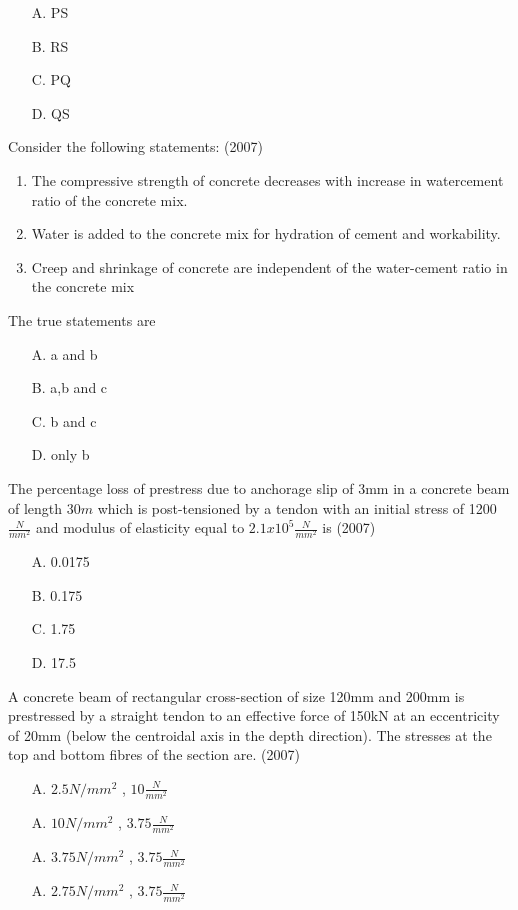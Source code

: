     \begin{enumerate}
        \item [A.] PS
        \item [B.] RS
        \item [C.] PQ
        \item [D.] QS
    \end{enumerate}
  \item  Consider the following statements: \hfill (2007)
  \begin{enumerate}
    \item The compressive strength of concrete decreases with increase in watercement ratio of the concrete mix.
    \item Water is added to the concrete mix for hydration of cement and
    workability. 
    \item Creep and shrinkage of concrete are independent of the water-cement ratio
    in the concrete mix
  \end{enumerate}
  The true statements are 
  \begin{enumerate}
    \item [A.] a and b
    \item [B.] a,b and c
    \item [C.] b and c
    \item [D.] only b
  \end{enumerate}
  \item The percentage loss of prestress due to anchorage slip of 3mm in a concrete beam
  of length $30m$ which is post-tensioned by a tendon with an initial stress of 1200 $\frac{N}{mm^2}$
  and modulus of elasticity equal to $2.1 x 10^5\frac{N}{mm^2}$ is \hfill (2007)
  \begin{enumerate}
    \item [A.] 0.0175 
    \item [B.] 0.175 
    \item [C.] 1.75 
    \item [D.] 17.5 
  \end{enumerate}
  \item  A concrete beam of rectangular cross-section of size 120mm  and 200mm
   is prestressed by a straight tendon to an effective force of 150kN at an
  eccentricity of 20mm (below the centroidal axis in the depth direction). The
  stresses at the top and bottom fibres of the section are. \hfill (2007)
  \begin{enumerate}
    \item [A.] $2.5N/mm^2$ , $10\frac{N}{mm^2}$ 
    \item [A.] $10N/mm^2$ , $3.75\frac{N}{mm^2}$
    \item [A.] $3.75N/mm^2$ , $3.75\frac{N}{mm^2}$ 
    \item [A.] $2.75N/mm^2$ , $3.75\frac{N}{mm^2}$ 
  \end{enumerate}
